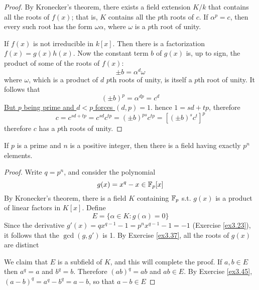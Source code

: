 \documentclass[11pt]{article}
\begin{document}
\begin{proof}
By Kronecker's theorem, there exists a field extension \(K/k\) that contains
all the roots of \(f(x)\); that is, \(K\) contains all the \(p\)th roots of
\(c\). If \(\alpha^p=c\), then every such root has the form \(\omega\alpha\), where
\(\omega\) is a \(p\)th root of unity.

If \(f(x)\) is not irreducible in \(k[x]\). Then there is a factorization
\(f(x)=g(x)h(x)\). Now the constant term \(b\) of \(g(x)\) is, up to sign, the
product of some of the roots of \(f(x)\):
\begin{equation*}
\pm b=\alpha^d\omega
\end{equation*}
where \(\omega\), which is a product of \(d\) \(p\)th roots of unity, is itself a
\(p\)th root of unity. It follows that 
\begin{equation*}
(\pm b)^p=\alpha^{dp}=c^d
\end{equation*}
\uline{But \(p\) being prime and \(d<p\) forces \((d,p)=1\)}. hence \(1=sd+tp\),
therefore
\begin{equation*}
c=c^{sd+tp}=c^{sd}c^{tp}=(\pm b)^{ps}c^{tp}=[(\pm b)^sc^t]^p
\end{equation*}
therefore \(c\) has a \(p\)th roots of unity.
\end{proof}

\begin{theorem}[Galois]
\label{thm3.127}
If \(p\) is a prime and \(n\) is a positive integer, then there is a field having
exactly \(p^n\) elements.
\end{theorem}

\begin{proof}
Write \(q=p^n\), and consider the polynomial
\begin{equation*}
g(x)=x^q-x\in\mathbb{F}_p[x]
\end{equation*}
By Kronecker's theorem, there is a field \(K\) containing \(\mathbb{F}_p\) s.t. \(g(x)\) is
a product of linear factors in \(K[x]\). Define
\begin{equation*}
E=\{\alpha\in K:g(\alpha)=0\}
\end{equation*}
Since the derivative \(g'(x)=qx^{q-1}-1=p^nx^{q-1}-1=-1\) (Exercise
\ref{ex3.23}), it follows that the \(\gcd(g,g')\) is 1. By Exercise \ref{ex3.37},
all the roots of \(g(x)\) are distinct

We claim that \(E\) is a subfield of \(K\), and this will complete the proof.
If \(a,b\in E\) then \(a^q=a\) and \(b^q=b\). Therefore \((ab)^q=ab\) and
\(ab\in E\). By Exercise \ref{ex3.45}, \((a-b)^q=a^q-b^q=a-b\), so that
\(a-b\in E\)
\end{proof}
\end{document}
